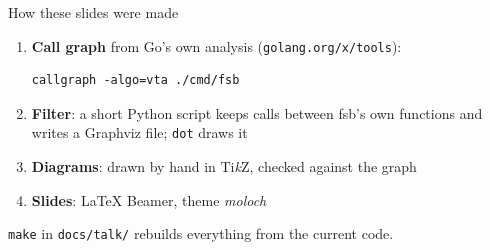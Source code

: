 \documentclass[aspectratio=169,11pt]{beamer}
\newcommand{\code}[1]{\texttt{\small #1}}
\begin{document}
\begin{frame}[fragile]{How these slides were made}
  \begin{enumerate}
    \item \textbf{Call graph} from Go's own analysis (\code{golang.org/x/tools}):
\begin{verbatim}
callgraph -algo=vta ./cmd/fsb
\end{verbatim}
    \item \textbf{Filter}: a short Python script keeps calls between fsb's own
      functions and writes a Graphviz file; \code{dot} draws it
    \item \textbf{Diagrams}: drawn by hand in Ti\emph{k}Z, checked against the graph
    \item \textbf{Slides}: \LaTeX{} Beamer, theme \emph{moloch}
  \end{enumerate}
  \vfill
  \small \code{make} in \code{docs/talk/} rebuilds everything from the current code.
\end{frame}
\end{document}
